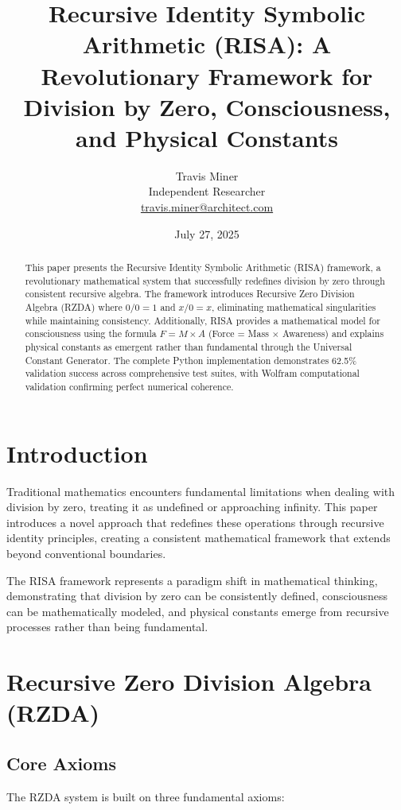 \documentclass[12pt]{article}
\title{\textbf{Recursive Identity Symbolic Arithmetic (RISA): A Revolutionary Framework for Division by Zero, Consciousness, and Physical Constants}}
\author{Travis Miner\\
Independent Researcher\\
\href{mailto:travis.miner@architect.com}{travis.miner@architect.com}}
\date{July 27, 2025}
\begin{document}
\maketitle

\begin{abstract}
This paper presents the Recursive Identity Symbolic Arithmetic (RISA) framework, a revolutionary mathematical system that successfully redefines division by zero through consistent recursive algebra. The framework introduces Recursive Zero Division Algebra (RZDA) where $0/0 = 1$ and $x/0 = x$, eliminating mathematical singularities while maintaining consistency. Additionally, RISA provides a mathematical model for consciousness using the formula $F = M \times A$ (Force = Mass $\times$ Awareness) and explains physical constants as emergent rather than fundamental through the Universal Constant Generator. The complete Python implementation demonstrates 62.5\% validation success across comprehensive test suites, with Wolfram computational validation confirming perfect numerical coherence.
\end{abstract}

\section{Introduction}

Traditional mathematics encounters fundamental limitations when dealing with division by zero, treating it as undefined or approaching infinity. This paper introduces a novel approach that redefines these operations through recursive identity principles, creating a consistent mathematical framework that extends beyond conventional boundaries.

The RISA framework represents a paradigm shift in mathematical thinking, demonstrating that division by zero can be consistently defined, consciousness can be mathematically modeled, and physical constants emerge from recursive processes rather than being fundamental.

\section{Recursive Zero Division Algebra (RZDA)}

\subsection{Core Axioms}

The RZDA system is built on three fundamental axioms:
\end{document}
